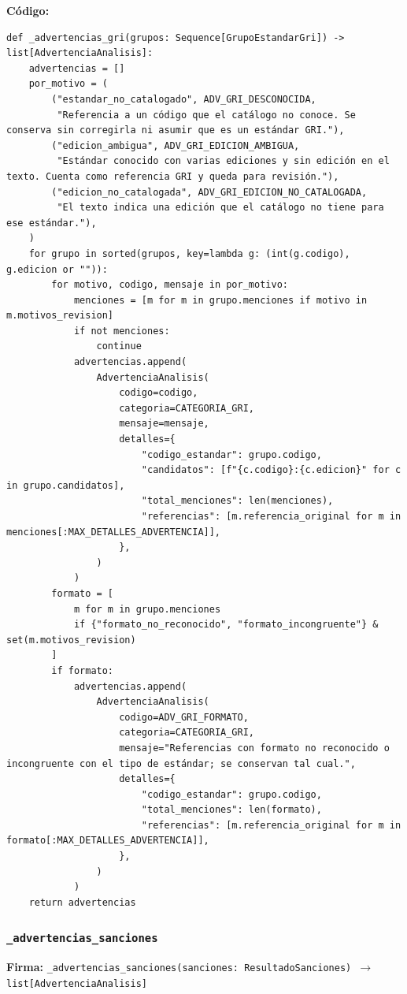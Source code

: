\documentclass[11pt,a4paper]{article}
\begin{document}
\textbf{Código:}
\begin{lstlisting}
def _advertencias_gri(grupos: Sequence[GrupoEstandarGri]) -> list[AdvertenciaAnalisis]:
    advertencias = []
    por_motivo = (
        ("estandar_no_catalogado", ADV_GRI_DESCONOCIDA,
         "Referencia a un código que el catálogo no conoce. Se conserva sin corregirla ni asumir que es un estándar GRI."),
        ("edicion_ambigua", ADV_GRI_EDICION_AMBIGUA,
         "Estándar conocido con varias ediciones y sin edición en el texto. Cuenta como referencia GRI y queda para revisión."),
        ("edicion_no_catalogada", ADV_GRI_EDICION_NO_CATALOGADA,
         "El texto indica una edición que el catálogo no tiene para ese estándar."),
    )
    for grupo in sorted(grupos, key=lambda g: (int(g.codigo), g.edicion or "")):
        for motivo, codigo, mensaje in por_motivo:
            menciones = [m for m in grupo.menciones if motivo in m.motivos_revision]
            if not menciones:
                continue
            advertencias.append(
                AdvertenciaAnalisis(
                    codigo=codigo,
                    categoria=CATEGORIA_GRI,
                    mensaje=mensaje,
                    detalles={
                        "codigo_estandar": grupo.codigo,
                        "candidatos": [f"{c.codigo}:{c.edicion}" for c in grupo.candidatos],
                        "total_menciones": len(menciones),
                        "referencias": [m.referencia_original for m in menciones[:MAX_DETALLES_ADVERTENCIA]],
                    },
                )
            )
        formato = [
            m for m in grupo.menciones
            if {"formato_no_reconocido", "formato_incongruente"} & set(m.motivos_revision)
        ]
        if formato:
            advertencias.append(
                AdvertenciaAnalisis(
                    codigo=ADV_GRI_FORMATO,
                    categoria=CATEGORIA_GRI,
                    mensaje="Referencias con formato no reconocido o incongruente con el tipo de estándar; se conservan tal cual.",
                    detalles={
                        "codigo_estandar": grupo.codigo,
                        "total_menciones": len(formato),
                        "referencias": [m.referencia_original for m in formato[:MAX_DETALLES_ADVERTENCIA]],
                    },
                )
            )
    return advertencias
\end{lstlisting}

\subsubsection*{\texttt{\_advertencias\_sanciones}}
\textbf{Firma:} \texttt{\_advertencias\_sanciones(sanciones: ResultadoSanciones) $\rightarrow$ list[AdvertenciaAnalisis]}
\end{document}

